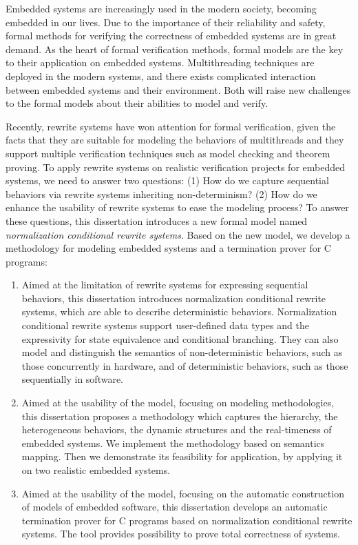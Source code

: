 \begin{eabstract}

Embedded systems are increasingly used in the modern society, becoming 
embedded in our lives. Due to the importance of their reliability and safety, 
formal methods for verifying the correctness of embedded systems are in great demand. As the heart of formal verification methods, formal models are the key to their application on embedded systems. Multithreading techniques are deployed in the modern systems, and there exists complicated interaction between embedded systems and their environment. Both will raise new challenges to the formal models about their abilities to model and verify.

Recently, rewrite systems have won attention for formal verification, given the facts that they are suitable for modeling the behaviors of multithreads and they support multiple verification techniques such as model checking and theorem proving. To apply rewrite systems on realistic verification projects for embedded systems, we need to answer two questions: (1) How do we capture sequential behaviors via rewrite systems inheriting non-determinism? (2) How do we enhance the usability of rewrite systems to ease the modeling process? To answer these questions, this dissertation introduces a new formal model named \emph{normalization conditional rewrite systems}. Based on the new model, we develop a methodology for modeling embedded systems and a termination prover \CTerm\xspace for C programs: 

\begin{enumerate}
\item Aimed at the limitation of rewrite systems for expressing sequential behaviors, this dissertation introduces normalization conditional rewrite systems, which are able to describe deterministic behaviors. Normalization conditional rewrite systems support user-defined data types and the expressivity for state equivalence and conditional branching. They can also model and distinguish the semantics of non-deterministic behaviors, such as those concurrently in hardware, and of deterministic behaviors, such as those sequentially in software. 
\item Aimed at the usability of the model, focusing on modeling methodologies, this dissertation proposes a methodology which captures the hierarchy, the heterogeneous behaviors, the dynamic structures and the real-timeness of embedded systems. We implement the methodology based on semantics mapping. Then we demonstrate its feasibility for application, by applying it on two realistic embedded systems. 
\item Aimed at the usability of the model, focusing on the automatic construction of models of embedded software, this dissertation develops an automatic termination prover \CTerm\xspace for C programs based on normalization conditional rewrite systems. The tool provides possibility to prove total correctness of systems.  
\end{enumerate}


\end{eabstract}

